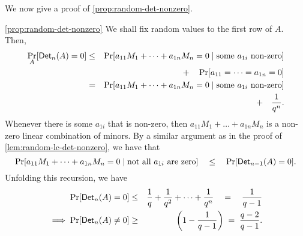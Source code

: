 We now give a proof of \autoref{prop:random-det-nonzero}. 

\begin{proofof}{\autoref{prop:random-det-nonzero}}
We shall fix random values to the first row of $A$. Then,
\begin{eqnarray*}
\Pr_{A}[\mathsf{Det}_n(A) = 0] & \leq & \Pr[a_{11} M_1 + \dots + a_{1n} M_n = 0 \;|\;\text{some $a_{1i}$ non-zero}]\\
& &\quad + \quad \Pr[a_{11}=\dots = a_{1n} = 0]\\
 & = & \Pr[a_{11} M_1 + \dots + a_{1n} M_n = 0 \;|\;\text{some $a_{1i}$ non-zero}]\\
 & & \quad + \quad \frac{1}{q^n}.
\end{eqnarray*}
Whenever there is some $a_{1i}$ that is non-zero, then $a_{11}M_1 +
\dots + a_{1n}M_n$ is a non-zero linear combination of minors. By a similar argument as in the proof of \autoref{lem:random-lc-det-nonzero}, we have that
$$
\Pr[a_{11} M_1 + \dots + a_{1n}M_n = 0\;|\;\text{not all $a_{1i}$ are zero}] \quad \leq \quad \Pr[\mathsf{Det}_{n-1}(A) = 0].
$$
Unfolding this recursion, we have
\begin{eqnarray*}
\Pr[\mathsf{Det}_n(A) = 0] & \leq & \frac{1}{q} + \frac{1}{q^2} + \dots + \frac{1}{q^n} \quad=\quad \frac{1}{q-1}\\
\implies \Pr[\mathsf{Det}_n(A) \neq 0] & \geq & \left(1 - \frac{1}{q-1}\right) \;=\; \frac{q-2}{q-1}.
\end{eqnarray*}
\end{proofof}



